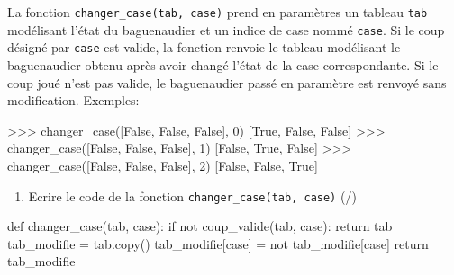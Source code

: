 \medskip

La fonction \verb|changer_case(tab, case)| prend en paramètres un tableau \texttt{tab} modélisant l'état du baguenaudier et un indice de case nommé \texttt{case}. Si le coup désigné par \texttt{case} est valide, la fonction renvoie le tableau modélisant le baguenaudier obtenu après avoir changé l'état de la case correspondante. Si le coup joué n'est pas valide, le baguenaudier passé en paramètre est renvoyé sans modification. 
Exemples:

\begin{CodePythontexAlt}[TaillePolice=\large, Largeur=1\linewidth,Centre,Lignes=true,PremLigne=1]{}
>>> changer_case([False, False, False], 0)
[True, False, False]
>>> changer_case([False, False, False], 1)
[False, True, False]
>>> changer_case([False, False, False], 2)
[False, False, True]
    
\end{CodePythontexAlt}
\begin{enumerate}[resume=monDS]
\item Ecrire le code de la fonction \verb|changer_case(tab, case)|  (/)
\end{enumerate}

\begin{blocvisible}[height=6]
    \begin{CodePythontexAlt}[TaillePolice=\large, Largeur=1\linewidth,Centre,Lignes=true,PremLigne=1]{}
    def changer_case(tab, case):
        if not coup_valide(tab, case):
            return tab
        tab_modifie = tab.copy()
        tab_modifie[case] = not tab_modifie[case]
        return tab_modifie
    \end{CodePythontexAlt}
\end{blocvisible}

\pagebreak



